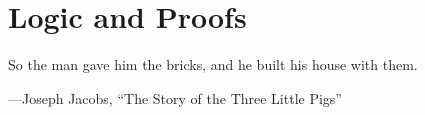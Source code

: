 \documentclass[../main.tex]{subfiles}
\begin{document}
\chapter{Logic and Proofs}
\epigraph{So the man gave him the bricks, and he built his house with them.}
{---Joseph Jacobs, ``The Story of the Three Little Pigs'' \cite{english-fairy-tales}}




\end{document}
